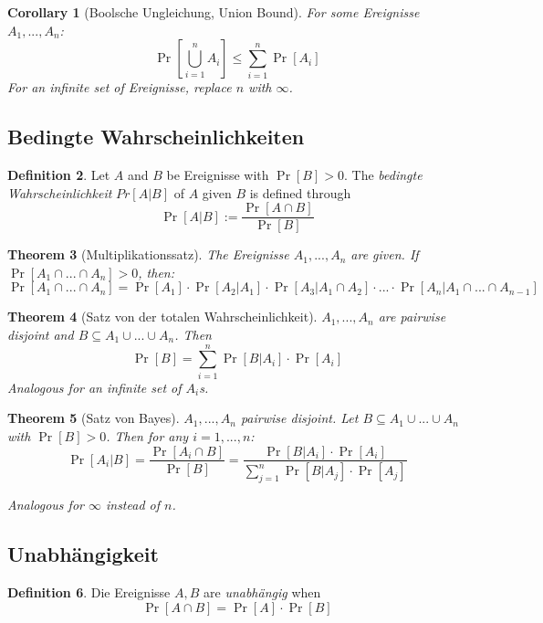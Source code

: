 \documentclass[12pt]{extarticle}
\theoremstyle{definition}
\newtheorem{definition}{Definition}[section]
\theoremstyle{remark}
\theoremstyle{plain}
\newtheorem{theorem}[definition]{Theorem}
\theoremstyle{plain}
\theoremstyle{plain}
\newtheorem{corollary}[definition]{Corollary}
\begin{document}
\begin{corollary}[Boolsche Ungleichung, Union Bound]
    For some Ereignisse $A_1, ..., A_n$:
    \[ \Pr \left[ \bigcup_{i=1}^n A_i \right] \le \sum_{i=1}^n \Pr[A_i]\]
    For an infinite set of Ereignisse, replace $n$ with $\infty$.
\end{corollary}

\subsection{Bedingte Wahrscheinlichkeiten}

\begin{definition}
    Let $A$ and $B$ be Ereignisse with $\Pr[B] > 0$.
    The \textit{bedingte Wahrscheinlichkeit} $Pr[A|B]$ of $A$ given $B$
    is defined through
    \[ \Pr[A|B] := \frac{\Pr[A \cap B]}{\Pr[B]} \]
\end{definition}

\begin{theorem}[Multiplikationssatz]
    The Ereignisse $A_1, ..., A_n$ are given.
    If $\Pr[A_1 \cap ... \cap A_n] > 0$, then:
    \[ \Pr[A_1 \cap ... \cap A_n] = \Pr[A_1] \cdot \Pr[A_2 | A_1] \cdot \Pr[A_3 | A_1 \cap A_2] \cdot ... \cdot \Pr[A_n | A_1 \cap ... \cap A_{n-1}] \]
\end{theorem}

\begin{theorem}[Satz von der totalen Wahrscheinlichkeit]
    $A_1, ..., A_n$ are pairwise disjoint and $B \subseteq A_1 \cup ... \cup A_n$.
    Then
    \[ \Pr[B] = \sum_{i=1}^n \Pr[B|A_i] \cdot \Pr[A_i] \]
    Analogous for an infinite set of $A_i$s.
\end{theorem}

\begin{theorem}[Satz von Bayes]
    $A_1, ..., A_n$ pairwise disjoint.
    Let $B \subseteq A_1 \cup ... \cup A_n$ with $\Pr[B] > 0$.
    Then for any $i = 1,...,n$:
    \[ \Pr[A_i | B] = \frac{\Pr[A_i \cap B]}{\Pr[B]} = \frac{\Pr[B|A_i] \cdot \Pr[A_i]}{\sum_{j=1}^n \Pr[B|A_j] \cdot \Pr[A_j]} \]

    Analogous for $\infty$ instead of $n$.
\end{theorem}

\subsection{Unabhängigkeit}

\begin{definition}
    Die Ereignisse $A, B$ are \textit{unabhängig} when
    \[ \Pr[A \cap B] = \Pr[A] \cdot \Pr[B] \]
\end{definition}
\end{document}
